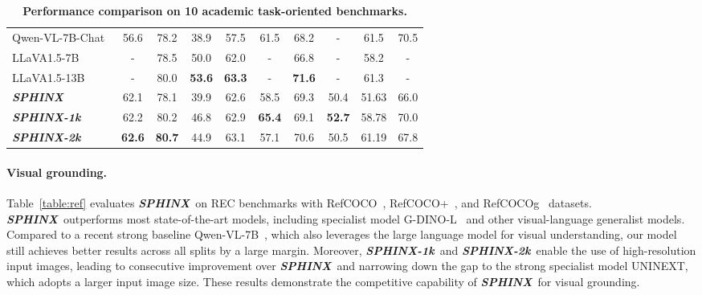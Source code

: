 \documentclass{article} \usepackage{iclr2024_conference,times}
\newcommand{\sphinx}{\textcolor{Goldenrod3}{\textbf{\textit{SPHINX}}}~}
\newcommand{\sphinxonek}{\textcolor{Goldenrod3}{\textbf{\textit{SPHINX-1k}}}~}
\newcommand{\sphinxtwok}{\textcolor{Goldenrod3}{\textbf{\textit{SPHINX-2k}}}~}
\begin{document}
\begin{table}[t]
{\begin{tabular}{l|ccccccccc}
Qwen-VL-7B-Chat~\citep{Bai2023QwenVLAF}                               & 56.6           & 78.2          & 38.9          & 57.5          & 61.5           & 68.2          & -                                      & 61.5          & 70.5                          \\
LLaVA1.5-7B~\citep{Liu2023ImprovedBW}                                   & -              & 78.5          & 50.0            & 62.0            &     -           & 66.8          & -                                      & 58.2          & -                             \\
LLaVA1.5-13B~\citep{Liu2023ImprovedBW}                                  & -              & 80.0            & \textbf{53.6} & \textbf{63.3} &   -             & \textbf{71.6} & -                                      & 61.3          & -                             \\ 
\cmidrule(lr){1-1}\cmidrule(lr){2-8}\cmidrule(lr){9-10}
\rowcolor[gray]{0.95}
\sphinx                                        & 62.1          & 78.1         & 39.9         & 62.6         & 58.5           &  69.3        & \cellcolor[gray]{0.95}50.4          & 51.63         & \cellcolor[gray]{0.95}66.0 \\
\rowcolor[gray]{0.95}
\sphinxonek                                   & 62.2 & 80.2 & 46.8         & 62.9         & \textbf{65.4} & 69.1         & \cellcolor[gray]{0.95}\textbf{52.7} & 58.78         & \cellcolor[gray]{0.95}70.0 \\
\rowcolor[gray]{0.95}
\sphinxtwok                                   & \textbf{62.6} & \textbf{80.7} & 44.9         & 63.1         & 57.1 & 70.6         & 50.5 & 61.19         & 67.8 \\ \bottomrule
\end{tabular}
} \caption{\textbf{Performance comparison on 10 academic task-oriented benchmarks.}}
\label{table:vqa}
\end{table}









\paragraph{Visual grounding.}
Table~\ref{table:ref} evaluates \sphinx on REC benchmarks with RefCOCO~\citep{Kazemzadeh2014ReferItGameRT}, RefCOCO+~\citep{Mao2015GenerationAC}, and RefCOCOg~\citep{Mao2015GenerationAC} datasets. \sphinx outperforms most state-of-the-art models, including specialist model G-DINO-L~\cite{Liu2023GroundingDM} and other visual-language generalist models. Compared to a recent strong baseline Qwen-VL-7B~\citep{Bai2023QwenVLAF}, which also leverages the large language model for visual understanding, our model still achieves better results across all splits by a large margin. Moreover, \sphinxonek and \sphinxtwok enable the use of high-resolution input images, leading to consecutive improvement over \sphinx and narrowing down the gap to the strong specialist model UNINEXT, which adopts a larger input image size. These results demonstrate the competitive capability of \sphinx for visual grounding.
\end{document}
